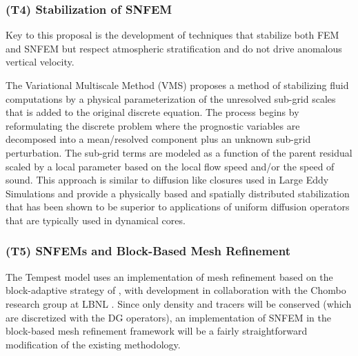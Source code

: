 \documentclass[11pt]{article}
\begin{document}
\subsubsection{(T4) Stabilization of SNFEM}

Key to this proposal is the development of techniques that stabilize both FEM and SNFEM but respect atmospheric stratification and do not drive anomalous vertical velocity.

The Variational Multiscale Method (VMS) proposes a method of stabilizing fluid computations by a physical parameterization of the unresolved sub-grid scales that is added to the original discrete equation. The process begins by reformulating the discrete problem where the prognostic variables are decomposed into a mean/resolved component plus an unknown sub-grid perturbation.  The sub-grid terms are modeled as a function of the parent residual scaled by a local parameter based on the local flow speed and/or the speed of sound. This approach is similar to diffusion like closures used in Large Eddy Simulations and provide a physically based and spatially distributed stabilization that has been shown to be superior to applications of uniform diffusion operators that are typically used in dynamical cores. \citep{hughes1998variational, marras2012variational, marras2013variational}

\subsubsection{(T5) SNFEMs and Block-Based Mesh Refinement}


The Tempest model uses an implementation of mesh refinement based on the block-adaptive strategy of \cite{MJBPC1989JCP}, with development in collaboration with the Chombo research group at LBNL \citep{ChomboDesign}.  Since only density and tracers will be conserved (which are discretized with the DG operators), an implementation of SNFEM in the block-based mesh refinement framework will be a fairly straightforward modification of the existing methodology.
\end{document}
